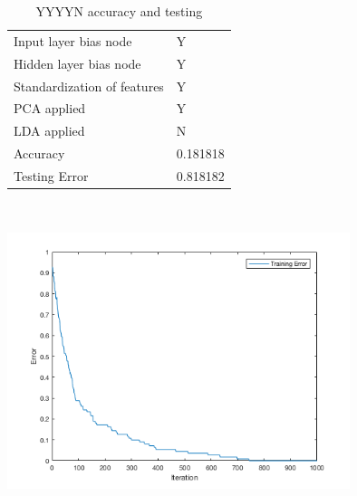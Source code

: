 \documentclass[12pt]{article}
\newcommand{\accuracyAndTestErrorTable}[8]{
  \begin{tabular}{l|l}
    \hline
    Input layer bias node & #1 \\
    Hidden layer bias node & #2 \\
    Standardization of features & #3 \\
    PCA applied & #4 \\
    LDA applied & #5 \\
    \hline
    Accuracy & #6 \\
    Testing Error & #7 \\
    \hline
  \end{tabular}
  ~\\[60pt]
  \caption{#8}
}
\begin{document}


\begin{center}
  \begin{table}[H]
    \begin{varwidth}[b]{0.4\linewidth}
      \centering
      \accuracyAndTestErrorTable{Y}{Y}{Y}{Y}{N}{0.181818}{0.818182}{YYYYN accuracy and testing}
      \label{table:YYYYN}
    \end{varwidth}%
    \hfill
    \begin{minipage}[b]{0.6\linewidth}
      \centering
      \includegraphics[width=100mm]{YYYYN_training_error.png}
      \label{fig:YYYYN}
    \end{minipage}
  \end{table}
\end{center}
\end{document}
